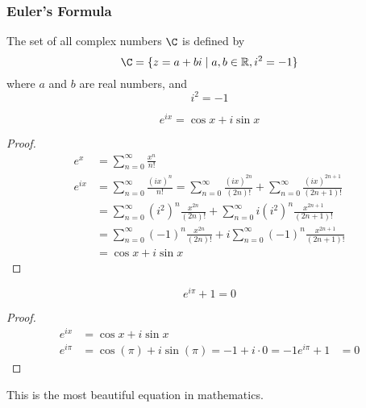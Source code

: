 \subsubsection*{Euler's Formula}

The set of all complex numbers \(\C\) is defined by
\[\C=\{z=a+bi\mid a,b\in\R,i^2=-1\}\]
where \(a\) and \(b\) are real numbers, and
\[i^2=-1\]
\begin{theorem}
    \[e^{ix}=\cos x+i\sin x\]
\end{theorem}
\begin{proof}
    \begin{align*}
        e^x &= \sum_{n=0}^\infty\frac{x^n}{n!} \\
        e^{ix} &= \sum_{n=0}^\infty\frac{(ix)^n}{n!}
        =\sum_{n=0}^\infty\frac{(ix)^{2n}}{(2n)!}
        +\sum_{n=0}^\infty\frac{(ix)^{2n+1}}{(2n+1)!} \\
        &= \sum_{n=0}^\infty(i^2)^n\frac{x^{2n}}{(2n)!}
        +\sum_{n=0}^\infty i(i^2)^n\frac{x^{2n+1}}{(2n+1)!} \\
        &= \sum_{n=0}^\infty(-1)^n\frac{x^{2n}}{(2n)!}
        +i\sum_{n=0}^\infty(-1)^n\frac{x^{2n+1}}{(2n+1)!} \\
        &= \cos x+i\sin x
    \end{align*}
\end{proof}
\begin{theorem}
    \[e^{i\pi}+1=0\]
\end{theorem}
\begin{proof}
    \begin{align*}
        e^{ix} &=\cos x+i\sin x \\
        e^{i\pi} &= \cos(\pi)+i\sin(\pi)=-1+i\cdot0=-1
        e^{i\pi}+1 &= 0
    \end{align*}
\end{proof}
This is the most beautiful equation in mathematics.